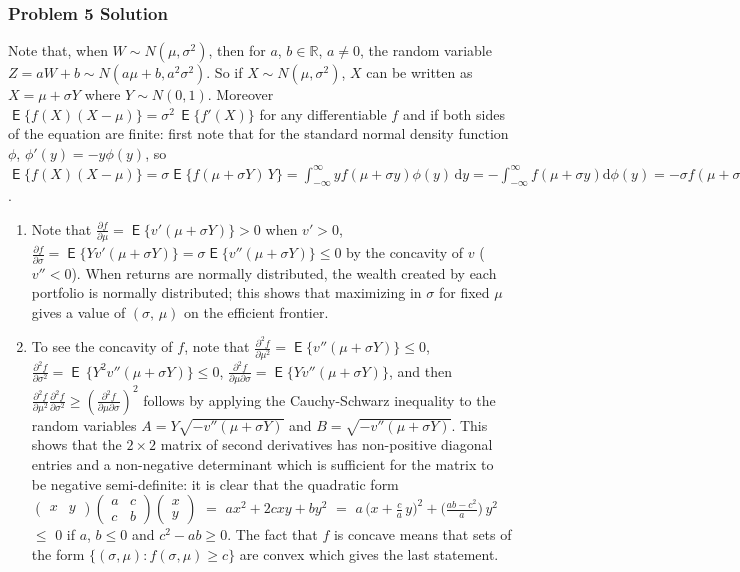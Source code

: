 \documentclass[10pt,handout]{beamer}
\newcommand{\ds}{\displaystyle}
\DeclareMathOperator\expc{\mathsf{E}}
\theoremstyle{definition}
\begin{document}
\begin{frame}[allowframebreaks]
  \frametitle{Problem 5 Solution}
  Note that, when $\ds W \sim N(\mu, \sigma^2)$, then for $a$, $b\in\mathbb{R}$, $a\ne 0$, the random variable $\ds Z = a W + b\sim N(a\mu + b, a^2\sigma^2)$. So if $X\sim N(\mu, \sigma^2)$, $X$ can be written as $X = \mu + \sigma Y$ where $Y\sim N(0,1)$. Moreover $\ds\expc\big\{f(X)(X - \mu)\big\} = \sigma^2\,\expc\big\{f'(X)\big\}$ for any differentiable $f$ and if both sides of the equation are finite: first note that for the standard normal density function $\phi$, $\phi'(y) = -y\phi(y)$, so $\ds\expc\big\{f(X)(X - \mu)\big\} = \sigma\expc\big\{f(\mu + \sigma Y)\,Y\big\} = \int_{-\infty}^{\infty}yf(\mu + \sigma y)\phi(y)\,\text{d}y = -\int_{-\infty}^{\infty}f(\mu + \sigma y)\text{d}\phi(y) = -\sigma f(\mu + \sigma y)\phi(y)\,\Big|_{-\infty}^{\infty} + \sigma^2\int_{-\infty}^{\infty}f'(\mu + \sigma y)\phi(y)\text{d}y = \sigma^2\int_{-\infty}^{\infty}f'(\mu + \sigma y)\phi(y)\text{d}y = \sigma^2\expc\big\{f'(X)\big\}$.
  \begin{enumerate}
    \item Note that $\ds\frac{\partial f}{\partial \mu} = \expc\{v'(\mu + \sigma Y)\} > 0$ when $\ds v' > 0$, $\ds\frac{\partial f}{\partial\sigma} = \expc\{Yv'(\mu + \sigma Y)\} = \sigma \expc\{v''(\mu + \sigma Y)\} \leqslant 0$ by the concavity of $v$ ($v'' < 0$). When returns are normally distributed, the wealth created by each portfolio is normally distributed; this shows that maximizing in $\sigma$ for fixed $\mu$ gives a value of $(\sigma,\,\mu)$ on the efficient frontier.
    \item To see the concavity of $f$, note that $\ds\frac{\partial^2 f}{\partial \mu^2} = \expc\{v''(\mu + \sigma Y)\} \leqslant 0$, $\ds\frac{\partial^2 f}{\partial \sigma^2} = \expc\,\{Y^2v''(\mu + \sigma Y)\} \leqslant 0$, $\ds \frac{\partial^2 f}{\partial \mu \partial \sigma} = \expc\{Yv''(\mu + \sigma Y)\}$, and then $\ds\frac{\partial^2 f}{\partial \mu^2}\frac{\partial^2 f}{\partial \sigma^2} \geqslant \left(\frac{\partial^2 f}{\partial \mu \partial \sigma}\right)^2$ follows by applying the Cauchy-Schwarz inequality to the random variables $A = Y\sqrt{-v''(\mu + \sigma Y)}$ and $B = \sqrt{-v''(\mu + \sigma Y)}$. This shows that the $2 \times 2$ matrix of second derivatives has non-positive diagonal entries and a non-negative determinant which is sufficient for the matrix to be negative semi-definite: it is clear that the quadratic form $\ds\begin{pmatrix}x & y\end{pmatrix}\begin{pmatrix}a & c\\ c & b\end{pmatrix}\begin{pmatrix}x \\ y\end{pmatrix}$ $=$ $\ds ax^2 + 2cxy + by^2$ $=$ $\ds a\,\Big(x + \frac{c}{a}\,y\Big)^2 + \Big(\frac{ab - c^2}{a}\Big)\,y^2$ \\$\leqslant$ $0$ if $a$, $b\leqslant 0$ and $c^2 - ab\geqslant 0$. The fact that $f$ is concave means that sets of the form $\{(\sigma,\mu) : f(\sigma,\mu) \geqslant c\}$ are convex which gives the last statement.

\end{enumerate}
\end{frame}
\end{document}
